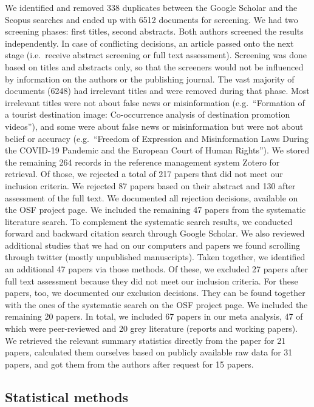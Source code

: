 \documentclass[
  man]{apa6}
\begin{document}
We identified and removed 338 duplicates between the Google Scholar and the Scopus searches and ended up with 6512 documents for screening. We had two screening phases: first titles, second abstracts. Both authors screened the results independently. In case of conflicting decisions, an article passed onto the next stage (i.e.~receive abstract screening or full text assessment). Screening was done based on titles and abstracts only, so that the screeners would not be influenced by information on the authors or the publishing journal. The vast majority of documents (6248) had irrelevant titles and were removed during that phase. Most irrelevant titles were not about false news or misinformation (e.g.~``Formation of a tourist destination image: Co-occurrence analysis of destination promotion videos''), and some were about false news or misinformation but were not about belief or accuracy (e.g.~``Freedom of Expression and Misinformation Laws During the COVID-19 Pandemic and the European Court of Human Rights''). We stored the remaining 264 records in the reference management system Zotero for retrieval. Of those, we rejected a total of 217 papers that did not meet our inclusion criteria. We rejected 87 papers based on their abstract and 130 after assessment of the full text. We documented all rejection decisions, available on the OSF project page. We included the remaining 47 papers from the systematic literature search. To complement the systematic search results, we conducted forward and backward citation search through Google Scholar. We also reviewed additional studies that we had on our computers and papers we found scrolling through twitter (mostly unpublished manuscripts). Taken together, we identified an additional 47 papers via those methods. Of these, we excluded 27 papers after full text assessment because they did not meet our inclusion criteria. For these papers, too, we documented our exclusion decisions. They can be found together with the ones of the systematic search on the OSF project page. We included the remaining 20 papers. In total, we included 67 papers in our meta analysis, 47 of which were peer-reviewed and 20 grey literature (reports and working papers). We retrieved the relevant summary statistics directly from the paper for 21 papers, calculated them ourselves based on publicly available raw data for 31 papers, and got them from the authors after request for 15 papers.

\subsection{Statistical methods}\label{statistical-methods}
\end{document}

